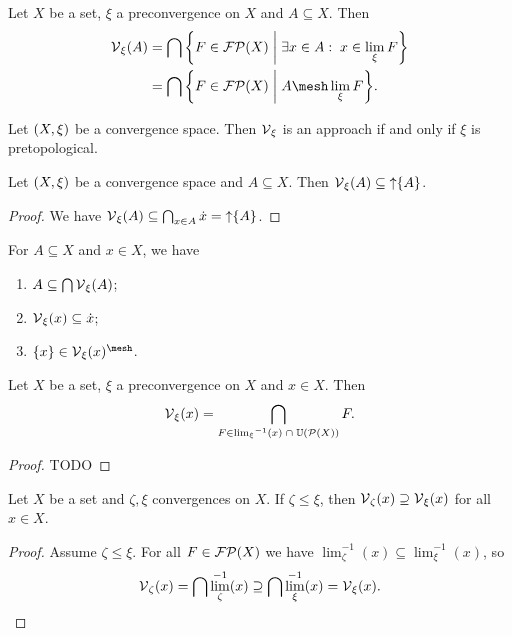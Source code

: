 \begin{lemma}
Let $X$ be a set, $\xi$ a preconvergence on $X$ and $A\subseteq X$. Then
\begin{align*}
\vicinity_\xi(A) &= \bigcap \setbuilder{F\in \powerfilters(X)}{\exists x\in A: \; x\in \lim_\xi F} \\
&= \bigcap \setbuilder{F\in \powerfilters(X)}{A \mesh \lim_\xi F}.
\end{align*}
\end{lemma}

\begin{lemma}
Let $\left( X,\xi \right)$ be a convergence space. Then $\operatorname{\mathcal{V}}_\xi$ is an approach \textup{if and only if} $\xi$ is pretopological.
\end{lemma}

\begin{lemma} \label{vicinityOfSetLemma}
Let $\left( X,\xi \right)$ be a convergence space and $A\subseteq X$. Then $\operatorname{\mathcal{V}}_\xi(A) \subseteq \operatorname{\uparrow}\{A\}$.
\end{lemma}
\begin{proof}
We have $\operatorname{\mathcal{V}}_\xi(A) \subseteq \bigcap_{x\in A}\dot{x} = \operatorname{\uparrow} \{A\}$. 
\end{proof}
\begin{corollary} \label{vicinityOfSetCorollary}
For $A\subseteq X$ and $x\in X$, we have
\begin{enumerate}
\item $A \subseteq \bigcap\operatorname{\mathcal{V}}_\xi(A)$;
\item $\operatorname{\mathcal{V}}_\xi(x) \subseteq \dot{x}$;
\item $\{x\}\in\vicinity_\xi(x)^{\mesh}$.
\end{enumerate}
\end{corollary}

\begin{lemma}
Let $X$ be a set, $\xi$ a preconvergence on $X$ and $x\in X$. Then
\[ \operatorname{\mathcal{V}}_\xi(x) = \bigcap_{F\in {\lim_\xi}^{-1}(x)\;\cap\; \operatorname{\mathbb{U}}(\operatorname{\mathcal{P}}(X))}F. \]
\end{lemma}
\begin{proof}
TODO
\end{proof}

\begin{lemma} \label{vicinityMapAntitone}
Let $X$ be a set and $\zeta, \xi$ convergences on $X$. If $\zeta \leq \xi$, then $\operatorname{\mathcal{V}}_\zeta(x) \supseteq \operatorname{\mathcal{V}}_\xi(x)$ for all $x\in X$.
\end{lemma}
\begin{proof}
Assume $\zeta \leq \xi$. For all $F\in \operatorname{\mathcal{FP}}(X)$ we have $\lim_\zeta^{-1}(x) \subseteq \lim_\xi^{-1}(x)$, so
\[ \operatorname{\mathcal{V}}_\zeta(x) = \bigcap \lim_\zeta^{-1}(x) \supseteq \bigcap \lim_\xi^{-1}(x) = \operatorname{\mathcal{V}}_\xi(x). \]
\end{proof}

